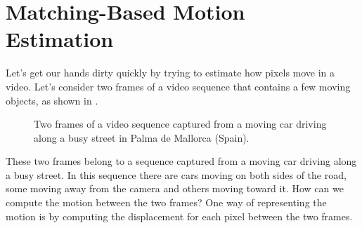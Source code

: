\section{Matching-Based Motion Estimation}
\label{sec:matching_based_motion}
Let's get our hands dirty quickly by trying to estimate how pixels move in a video. Let's consider two frames of a video sequence that contains a few moving objects, as shown in \fig{\ref{fig:two_frames_from_palma_street}}.

\begin{figure}
    \centerline{
    }
    \caption{Two frames of a video sequence captured from a moving car driving along a busy street in Palma de Mallorca (Spain).}
    \label{fig:two_frames_from_palma_street}
\end{figure}

These two frames belong to a sequence captured from a moving car driving along a busy street. In this sequence there are cars moving on both sides of the road, some moving away from the camera and others moving toward it.  How can we compute the motion between the two frames? One way of representing the motion is by computing the displacement for each pixel between the two frames.

